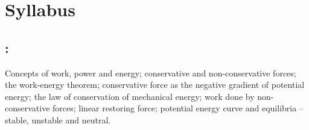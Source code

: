 \section*{Syllabus}

    \subsection*{\topicSubTitle: \topicTitle}
        Concepts of work, power and energy; conservative and non-conservative forces; the work-energy theorem; conservative force as the negative gradient of potential energy; the law of conservation of mechanical energy; work done by non-conservative forces; linear restoring force; potential energy curve and equilibria -- stable, unstable and neutral.
